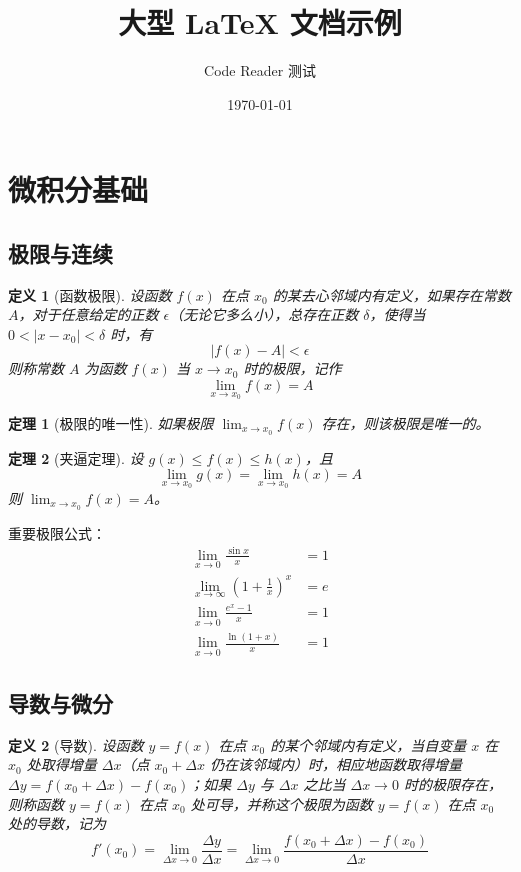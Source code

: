 \documentclass[12pt]{article}
\title{大型 LaTeX 文档示例}
\author{Code Reader 测试}
\date{\today}
\newtheorem{theorem}{定理}
\newtheorem{definition}{定义}
\begin{document}
\maketitle

\tableofcontents

\newpage


\section{微积分基础}

\subsection{极限与连续}

\begin{definition}[函数极限]
设函数 $f(x)$ 在点 $x_0$ 的某去心邻域内有定义，如果存在常数 $A$，对于任意给定的正数 $\epsilon$（无论它多么小），总存在正数 $\delta$，使得当 $0 < |x - x_0| < \delta$ 时，有
$$|f(x) - A| < \epsilon$$
则称常数 $A$ 为函数 $f(x)$ 当 $x \to x_0$ 时的极限，记作
$$\lim_{x \to x_0} f(x) = A$$
\end{definition}

\begin{theorem}[极限的唯一性]
如果极限 $\lim_{x \to x_0} f(x)$ 存在，则该极限是唯一的。
\end{theorem}

\begin{theorem}[夹逼定理]
设 $g(x) \leq f(x) \leq h(x)$，且
$$\lim_{x \to x_0} g(x) = \lim_{x \to x_0} h(x) = A$$
则 $\lim_{x \to x_0} f(x) = A$。
\end{theorem}

重要极限公式：
\begin{align}
\lim_{x \to 0} \frac{\sin x}{x} &= 1 \\
\lim_{x \to \infty} \left(1 + \frac{1}{x}\right)^x &= e \\
\lim_{x \to 0} \frac{e^x - 1}{x} &= 1 \\
\lim_{x \to 0} \frac{\ln(1+x)}{x} &= 1
\end{align}

\subsection{导数与微分}

\begin{definition}[导数]
设函数 $y = f(x)$ 在点 $x_0$ 的某个邻域内有定义，当自变量 $x$ 在 $x_0$ 处取得增量 $\Delta x$（点 $x_0 + \Delta x$ 仍在该邻域内）时，相应地函数取得增量 $\Delta y = f(x_0 + \Delta x) - f(x_0)$；如果 $\Delta y$ 与 $\Delta x$ 之比当 $\Delta x \to 0$ 时的极限存在，则称函数 $y = f(x)$ 在点 $x_0$ 处可导，并称这个极限为函数 $y = f(x)$ 在点 $x_0$ 处的导数，记为
$$f'(x_0) = \lim_{\Delta x \to 0} \frac{\Delta y}{\Delta x} = \lim_{\Delta x \to 0} \frac{f(x_0 + \Delta x) - f(x_0)}{\Delta x}$$
\end{definition}
\end{document}
